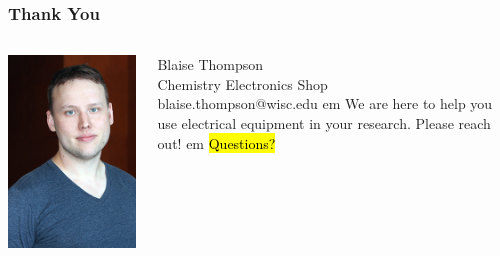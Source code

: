 \documentclass{presentation}
\begin{document}
\begin{frame}\frametitle{Thank You}
  \begin{columns}
    \begin{column}{0.33\textwidth}
      \includegraphics[width=\textwidth]{"./Thompson_Blaise_LowRes.jpg"}
    \end{column}
    \begin{column}{0.67\textwidth}
      Blaise Thompson \\
      Chemistry Electronics Shop \\
      blaise.thompson@wisc.edu
       em
      We are here to help you use electrical equipment in your research.
      Please reach out!
       em
      \hl{Questions?}
    \end{column}
  \end{columns}
\end{frame}
\end{document}
